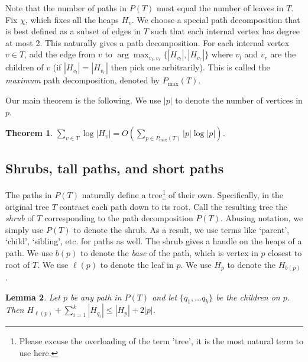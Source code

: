 \documentclass[11pt]{article}
\newtheorem{theorem}{Theorem}
\newtheorem{lemma}[theorem]{Lemma}
\theoremstyle{definition}
\newcommand{\pmax}{P_{\max}}
\begin{document}
Note that the number of paths in $P(T)$ must equal the number of leaves in $T$.
Fix $\chi$, which fixes all the heaps $H_v$. We choose a special path decomposition that is best defined as a subset of edges in $T$ such that each internal
vertex has degree at most $2$. This naturally gives a path decomposition.
For each internal vertex $v\in T$, add the edge from $v$ to $\arg \max_{v_l, v_r} \{|H_{v_l}|, |H_{v_r}|\}$ 
 where $v_l$ and $v_r$ are the children of $v$ (if $|H_{v_l}|=|H_{v_r}|$ then pick one arbitrarily).
This is called the \emph{maximum} path decomposition, denoted by $\pmax(T)$.

Our main theorem is the following. We use $|p|$ to denote the number of vertices in $p$.

\begin{theorem} \label{thm:runtime} $\sum_{v \in T} \log |H_v| = O(\sum_{p\in \pmax(T)} |p| \log |p|)$.
\end{theorem}


\subsection{Shrubs, tall paths, and short paths}


The paths in $P(T)$ naturally define a tree\footnote{Please excuse the 
overloading of the term 'tree', it is the most natural term to use here.} of their own.  Specifically, in the original 
tree $T$ contract each path down to its root.  Call the resulting tree the \emph{shrub} of $T$ corresponding to 
the path decomposition $P(T)$. Abusing notation, we simply use $P(T)$ to denote the shrub.
As a result, we use terms like `parent', `child', `sibling', etc. for paths as well.
The shrub gives a handle on the heaps of a path.
We use $b(p)$ to denote the \emph{base} of the path, which is vertex in $p$ closest
to root of $T$. We use $\ell(p)$ to denote the leaf in $p$.
We use $H_p$ to denote the $H_{b(p)}$.

\begin{lemma}
\label{lem:adjacent}
 Let $p$ be any path in $P(T)$ and let $\{q_1, \dots q_k\}$ be the children on $p$.
Then $H_{\ell(p)} + \sum_{i=1}^k |H_{q_i}| \leq |H_p|+2|p|$. 
\end{lemma}
\end{document}
